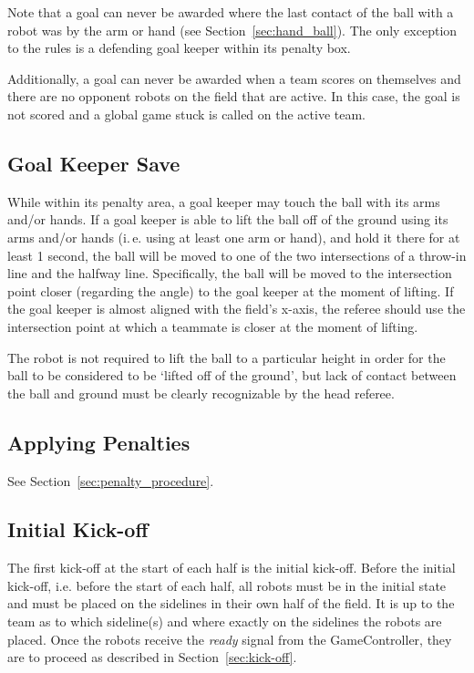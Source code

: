 \documentclass[12pt]{article}
\newcommand{\ie}{\mbox{i.\,e.}\xspace}
\begin{document}
Note that a goal can never be awarded where the last contact of the ball with a robot was by the arm or hand (see Section~\ref{sec:hand_ball}).  The only exception to the rules is a defending goal keeper within its penalty box.

Additionally, a goal can never be awarded when a team scores on themselves and there are no opponent robots on the field that are active.  In this case, the goal is not scored and a global game stuck is called on the active team.

\subsection{Goal Keeper Save}
\label{sec:goalie_save}
While within its penalty area, a goal keeper may touch the ball with its arms and/or hands.  If a goal keeper is able to lift the ball off of the ground using its arms and/or hands (\ie using at least one arm or hand), and hold it there for at least 1 second, the ball will be moved to one of the two intersections of a throw-in line and the halfway line. Specifically, the ball will be moved to the intersection point closer (regarding the angle) to the goal keeper at the moment of lifting. If the goal keeper is almost aligned with the field's x-axis, the referee should use the intersection point at which a teammate is closer at the moment of lifting.

The robot is not required to lift the ball to a particular height in order for the ball to be considered to be `lifted off of the ground', but lack of contact between the ball and ground must be clearly recognizable by the head referee.

\subsection{Applying Penalties}

See Section~\ref{sec:penalty_procedure}.


\subsection{Initial Kick-off}
\label{sec:initial-kick-off}

The first kick-off at the start of each half is the initial kick-off.
Before the initial kick-off, i.e. before the start of each half, all robots must be in the initial state and must be placed on the sidelines in their own half of the field.
It is up to the team as to which sideline(s) and where exactly on the sidelines the robots are placed.
Once the robots receive the \emph{ready} signal from the GameController, they are to proceed as described in Section~\ref{sec:kick-off}.
\end{document}
